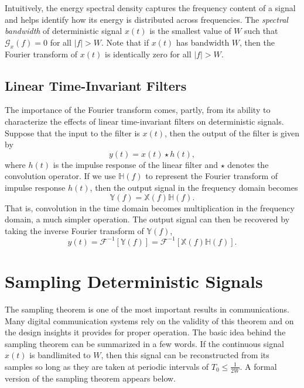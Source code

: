 Intuitively, the energy spectral density captures the frequency content of a signal and helps identify how its energy is distributed across frequencies.
The \emph{spectral bandwidth} of deterministic signal $x(t)$ is the smallest value of $W$ such that $\mathcal{G}_x(f) = 0$ for all $|f| > W$.
Note that if $x(t)$ has bandwidth $W$, then the Fourier transform of $x(t)$ is identically zero for all $|f| > W$.


\subsection{Linear Time-Invariant Filters}
\label{subsection:LinearTimeInvariantFilters}

The importance of the Fourier transform comes, partly, from its ability to characterize the effects of linear time-invariant filters on deterministic signals.
Suppose that the input to the filter is $x(t)$, then the output of the filter is given by
\begin{equation*}
y(t) = x(t) \star h(t),
\end{equation*}
where $h(t)$ is the impulse response of the linear filter and $\star$ denotes the convolution operator.
If we use $\mathbb{H}(f)$ to represent the Fourier transform of impulse response $h(t)$, then the output signal in the frequency domain becomes
\begin{equation*}
\mathbb{Y}(f) = \mathbb{X}(f) \mathbb{H}(f) .
\end{equation*}
That is, convolution in the time domain becomes multiplication in the frequency domain, a much simpler operation.
The output signal can then be recovered by taking the inverse Fourier transform of $\mathbb{Y}(f)$,
\begin{equation*}
y(t) = \mathcal{F}^{-1} [ \mathbb{Y}(f) ] = \mathcal{F}^{-1} [ \mathbb{X}(f) \mathbb{H}(f) ] .
\end{equation*}
\section{Sampling Deterministic Signals}

The sampling theorem is one of the most important results in communications.
Many digital communication systems rely on the validity of this theorem and on the design insights it provides for proper operation.
The basic idea behind the sampling theorem can be summarized in a few words.
If the continuous signal $x(t)$ is bandlimited to $W$, then this signal can be reconstructed from its samples so long as they are taken at periodic intervals of $T_0 \leq \frac{1}{2W}$.
A formal version of the sampling theorem appears below.

